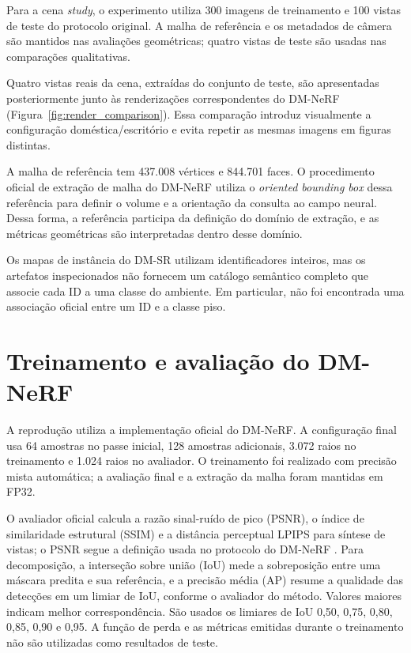 Para a cena \textit{study}, o experimento utiliza 300 imagens de treinamento e 100 vistas de teste do protocolo original. A malha de referência e os metadados de câmera são mantidos nas avaliações geométricas; quatro vistas de teste são usadas nas comparações qualitativas.

Quatro vistas reais da cena, extraídas do conjunto de teste, são apresentadas posteriormente junto às renderizações correspondentes do DM-NeRF (Figura~\ref{fig:render_comparison}). Essa comparação introduz visualmente a configuração doméstica/escritório e evita repetir as mesmas imagens em figuras distintas.

A malha de referência tem 437.008 vértices e 844.701 faces. O procedimento oficial de extração de malha do DM-NeRF utiliza o \textit{oriented bounding box} dessa referência para definir o volume e a orientação da consulta ao campo neural. Dessa forma, a referência participa da definição do domínio de extração, e as métricas geométricas são interpretadas dentro desse domínio.

Os mapas de instância do DM-SR utilizam identificadores inteiros, mas os artefatos inspecionados não fornecem um catálogo semântico completo que associe cada ID a uma classe do ambiente. Em particular, não foi encontrada uma associação oficial entre um ID e a classe piso.

\section{Treinamento e avaliação do DM-NeRF}

A reprodução utiliza a implementação oficial do DM-NeRF. A configuração final usa 64 amostras no passe inicial, 128 amostras adicionais, 3.072 raios no treinamento e 1.024 raios no avaliador. O treinamento foi realizado com precisão mista automática; a avaliação final e a extração da malha foram mantidas em FP32.

O avaliador oficial calcula a razão sinal-ruído de pico (PSNR), o índice de similaridade estrutural (SSIM) \citep{wang2004ssim} e a distância perceptual LPIPS \citep{zhang2018lpips} para síntese de vistas; o PSNR segue a definição usada no protocolo do DM-NeRF \citep{wang2023dmnerf}. Para decomposição, a interseção sobre união (IoU) mede a sobreposição entre uma máscara predita e sua referência, e a precisão média (AP) resume a qualidade das detecções em um limiar de IoU, conforme o avaliador do método. Valores maiores indicam melhor correspondência. São usados os limiares de IoU 0,50, 0,75, 0,80, 0,85, 0,90 e 0,95. A função de perda e as métricas emitidas durante o treinamento não são utilizadas como resultados de teste.

